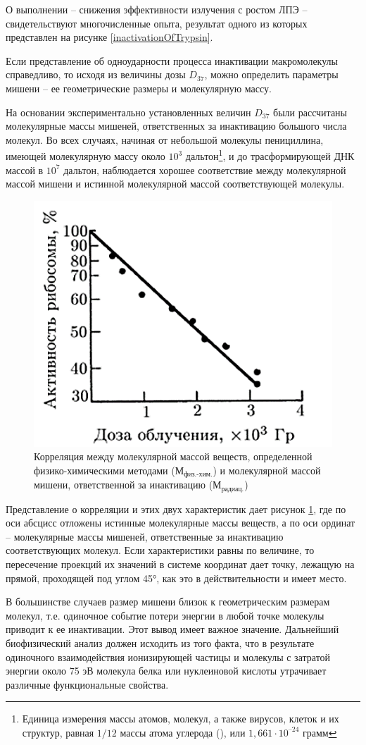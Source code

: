 \documentclass[a4paper, 14pt]{article}
\renewcommand{\emph}[1]{{\color{orange}{\textit{\textbf{#1}}}}}
\begin{document}
О выполнении \emph{третьего условия} – снижения эффективности излучения с ростом ЛПЭ – свидетельствуют многочисленные опыта, результат одного из которых представлен на рисунке \ref{inactivationOfTrypsin}.

Если представление об одноударности процесса инактивации макромолекулы
справедливо, то исходя из величины дозы $D_{37}$, можно определить параметры мишени –
ее геометрические размеры и молекулярную массу.

На основании экспериментально установленных величин $D_{37}$ были рассчитаны
молекулярные массы мишеней, ответственных за инактивацию большого числа
молекул. Во всех случаях, начиная от небольшой молекулы пенициллина, имеющей
молекулярную массу около $10^3$ дальтон\footnote{Единица измерения массы атомов, молекул, а также вирусов, клеток и их структур, равная $1/12$ массы атома углерода (), или $1,661\cdot 10^{–24}$ грамм}, и до трасформирующей ДНК массой в $10^7$
дальтон, наблюдается хорошее соответствие между молекулярной массой мишени и
истинной молекулярной массой соответствующей молекулы.

\begin{figure}
    \centering
    \includegraphics[width=.4\textwidth]{ribosomeInactivation.png}
    \caption{Корреляция между молекулярной массой веществ, определенной физико-химическими методами (М$_\text{физ.-хим.}$) и молекулярной массой мишени, ответственной за инактивацию  (М$_\text{радиац.}$)}
    \label{correlation}
\end{figure}

Представление о корреляции и этих двух характеристик дает рисунок \ref{correlation}, где по оси абсцисс отложены истинные молекулярные массы веществ, а по оси ординат – молекулярные массы мишеней, ответственные за инактивацию соответствующих молекул. Если характеристики равны по величине, то пересечение проекций их значений в системе координат дает точку, лежащую на прямой, проходящей под углом 45°, как это в действительности и имеет место. 

В большинстве случаев размер мишени близок к геометрическим размерам молекул, т.е. одиночное событие потери энергии в любой точке молекулы приводит к ее инактивации. Этот вывод имеет важное значение. Дальнейший биофизический анализ должен исходить из того факта, что в результате одиночного взаимодействия ионизирующей частицы и молекулы с затратой энергии около 75 эВ молекула белка или нуклеиновой кислоты утрачивает различные функциональные свойства.
\end{document}
